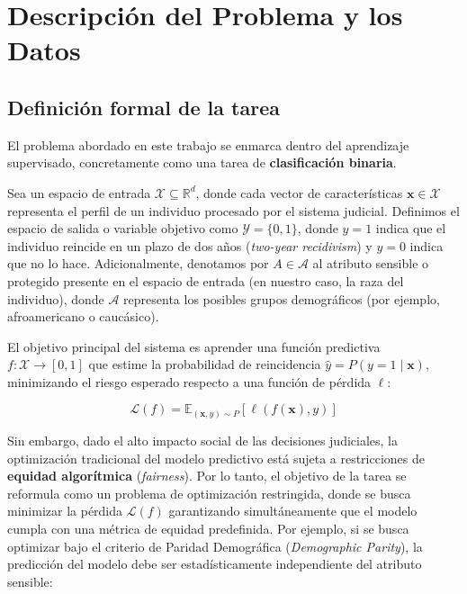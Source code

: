 \documentclass[11pt,a4paper]{article}
\begin{document}
\section{Descripción del Problema y los Datos}
\label{sec:datos}

\subsection{Definición formal de la tarea}

El problema abordado en este trabajo se enmarca dentro del aprendizaje supervisado, concretamente como una tarea de \textbf{clasificación binaria}. 


Sea un espacio de entrada $\mathcal{X} \subseteq \mathbb{R}^d$, donde cada vector de características $\bm{x} \in \mathcal{X}$ representa el perfil de un individuo procesado por el sistema judicial. Definimos el espacio de salida o variable objetivo como $\mathcal{Y} = \{0, 1\}$, donde $y = 1$ indica que el individuo reincide en un plazo de dos años (\textit{two-year recidivism}) y $y = 0$ indica que no lo hace. Adicionalmente, denotamos por $A \in \mathcal{A}$ al atributo sensible o protegido presente en el espacio de entrada (en nuestro caso, la raza del individuo), donde $\mathcal{A}$ representa los posibles grupos demográficos (por ejemplo, afroamericano o caucásico).

El objetivo principal del sistema es aprender una función predictiva $f\colon \mathcal{X} \to [0,1]$ que estime la probabilidad de reincidencia $\hat{y} = P(y=1 \mid \bm{x})$, minimizando el riesgo esperado respecto a una función de pérdida $\ell$:

$$ \mathcal{L}(f) = \mathbb{E}_{(\bm{x},y)\sim P}[\ell(f(\bm{x}), y)] $$

Sin embargo, dado el alto impacto social de las decisiones judiciales, la optimización tradicional del modelo predictivo está sujeta a restricciones de \textbf{equidad algorítmica} (\textit{fairness}). Por lo tanto, el objetivo de la tarea se reformula como un problema de optimización restringida, donde se busca minimizar la pérdida $\mathcal{L}(f)$ garantizando simultáneamente que el modelo cumpla con una métrica de equidad predefinida. Por ejemplo, si se busca optimizar bajo el criterio de Paridad Demográfica (\textit{Demographic Parity}), la predicción del modelo debe ser estadísticamente independiente del atributo sensible:
\end{document}
